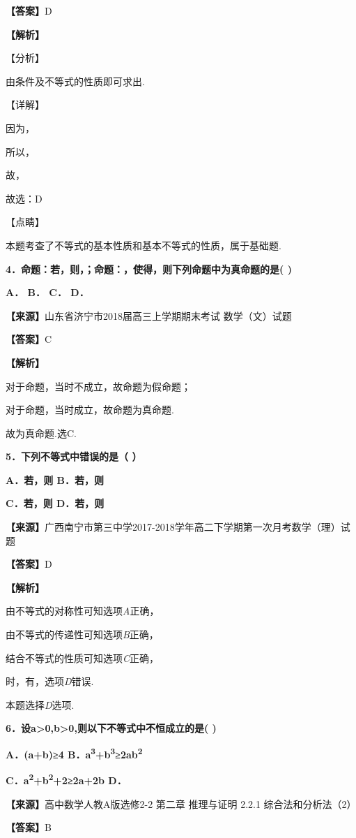 \textbf{【答案】}D

\textbf{【解析】}

【分析】

由条件及不等式的性质即可求出.

【详解】

因为，

所以，

故，

故选：D

【点睛】

本题考查了不等式的基本性质和基本不等式的性质，属于基础题.

\textbf{4．命题：若，则，；命题：，使得，则下列命题中为真命题的是( )}

\textbf{A． B． C． D．}

\textbf{【来源】}山东省济宁市2018届高三上学期期末考试 数学（文）试题

\textbf{【答案】}C

\textbf{【解析】}

对于命题，当时不成立，故命题为假命题；

对于命题，当时成立，故命题为真命题.

故为真命题.选C.

\textbf{5．下列不等式中错误的是（ ）}

\textbf{A．若，则 B．若，则}

\textbf{C．若，则 D．若，则}

\textbf{【来源】}广西南宁市第三中学2017-2018学年高二下学期第一次月考数学（理）试题

\textbf{【答案】}D

\textbf{【解析】}

由不等式的对称性可知选项\emph{A}正确，

由不等式的传递性可知选项\emph{B}正确，

结合不等式的性质可知选项\emph{C}正确，

时，有，选项\emph{D}错误.

本题选择\emph{D}选项.

\textbf{6．设a\textgreater0,b\textgreater0,则以下不等式中不恒成立的是(
)}

\textbf{A．(a+b)≥4
B．a\textsuperscript{3}+b\textsuperscript{3}≥2ab\textsuperscript{2}}

\textbf{C．a\textsuperscript{2}+b\textsuperscript{2}+2≥2a+2b D．}

\textbf{【来源】}高中数学人教A版选修2-2 第二章 推理与证明 2.2.1
综合法和分析法（2）

\textbf{【答案】}B

